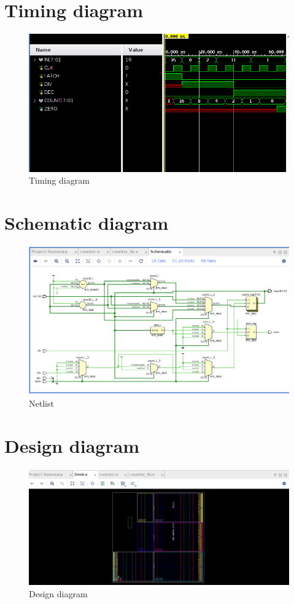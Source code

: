 \documentclass{article}
\begin{document}
\section{Timing diagram}
\begin{figure}[h]
    \centering
\includegraphics[width=\columnwidth]{figs/timing diagram.png}
    \caption{Timing diagram}
    \label{fig:my_label}
\end{figure}
\vspace{10cm}

\section{Schematic diagram}
\begin{figure}[h]
    \centering
\includegraphics[width=\columnwidth]{figs/schematic diagram.png}
    \caption{Netlist}
    \label{fig:my_label}
\end{figure}
\vspace{10cm}

\section{Design diagram}
\begin{figure}[h]
    \centering
\includegraphics[width=\columnwidth]{figs/design diagram.png}
    \caption{Design diagram}
    \label{fig:my_label}
\end{figure}
\end{document}
